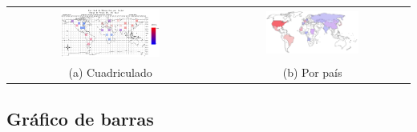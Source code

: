 \documentclass[letterpaper,10pt]{article}
\begin{document}
	\begin{tabular}{cc}
		\includegraphics[width=0.5\textwidth]{mapamundiQuad.png} & \includegraphics[width=0.5\textwidth]{mapamundiPol.png}\\
		(a) Cuadriculado & (b) Por país\\
	\end{tabular}

	\newpage

	\subsection{Gráfico de barras}

\end{document}
